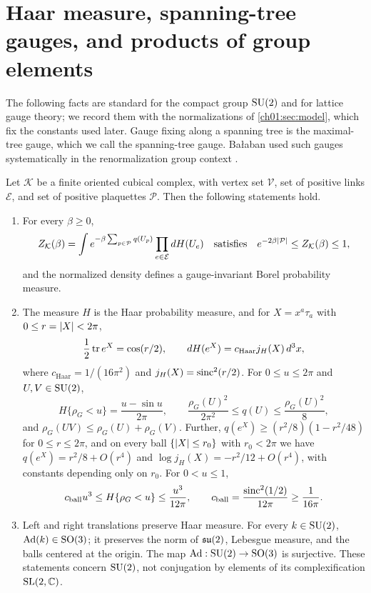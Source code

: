 \section{Haar measure, spanning-tree gauges, and products of group elements}\label{ch02:sec:haar}

The following facts are standard for the compact group $\mathrm{SU}(2)$ and for lattice gauge theory; we record them with the normalizations of \cref{ch01:sec:model}, which fix the constants used later. Gauge fixing along a spanning tree is the maximal-tree gauge, which we call the spanning-tree gauge. Bałaban used such gauges systematically in the renormalization group context \cite{Balaban1985Regular}.

\begin{lemma}\label{ch02:lem:haar-and-forests}
Let $\mathcal K$ be a finite oriented cubical complex, with vertex set $\mathcal V$, set of positive links $\mathcal E$, and set of positive plaquettes $\mathcal P$. Then the following statements hold.
\begin{enumerate}
\item For every $\beta\ge0$,
\[
 Z_{\mathcal K}(\beta)=\int e^{-\beta\sum_{p\in\mathcal P}q(U_p)}\prod_{e\in\mathcal E}dH(U_e)
 \quad\text{satisfies}\quad e^{-2\beta\lvert \mathcal P\rvert}\le Z_{\mathcal K}(\beta)\le1,
\]
and the normalized density defines a gauge-invariant Borel probability measure.
\item The measure $H$ is the Haar probability measure, and for $X=x^a\tau_a$ with $0\le r=\lvert X\rvert<2\pi$,
\[
 \frac12\operatorname{tr} e^X=\cos(r/2),\qquad
 dH(e^X)=c_{\mathrm{Haar}}j_H(X)\,d^3x,
\]
where $c_{\mathrm{Haar}}=1/(16\pi^2)$ and $j_H(X)=\operatorname{sinc}^2(r/2)$.
For $0\le u\le2\pi$ and $U,V\in\mathrm{SU}(2)$,
\[
 H\{\rho_G<u\}=\frac{u-\sin u}{2\pi},\qquad
 \frac{\rho_G(U)^2}{2\pi^2}\le q(U)\le\frac{\rho_G(U)^2}{8},
\]
and $\rho_G(UV)\le\rho_G(U)+\rho_G(V)$.
Further, $q(e^X)\ge(r^2/8)(1-r^2/48)$ for $0\le r\le2\pi$, and on every ball $\{\lvert X\rvert\le r_0\}$ with $r_0<2\pi$ we have $q(e^X)=r^2/8+O(r^4)$ and $\log j_H(X)=-r^2/12+O(r^4)$, with constants depending only on $r_0$. For $0<u\le1$,
\[
 c_{\mathrm{ball}}u^3\le H\{\rho_G<u\}\le\frac{u^3}{12\pi},\qquad
 c_{\mathrm{ball}}=\frac{\operatorname{sinc}^2(1/2)}{12\pi}\ge\frac1{16\pi}.
\]
\item Left and right translations preserve Haar measure. For every $k\in\mathrm{SU}(2)$, $\operatorname{Ad}(k)\in\mathrm{SO}(3)$; it preserves the norm of $\mathfrak{su}(2)$, Lebesgue measure, and the balls centered at the origin. The map $\operatorname{Ad}:\mathrm{SU}(2)\to\mathrm{SO}(3)$ is surjective. These statements concern $\mathrm{SU}(2)$, not conjugation by elements of its complexification $\mathrm{SL}(2,\mathbb C)$.

\end{enumerate}
\end{lemma}
